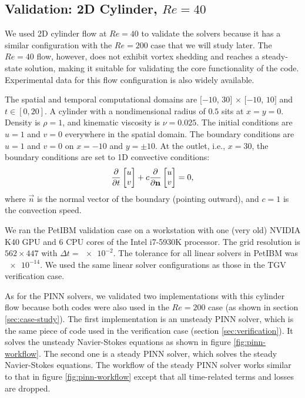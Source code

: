 
\subsection{Validation: 2D Cylinder, $Re=\num{40}$}\label{sec:val_2d_cylinder_re40}

We used 2D cylinder flow at $Re=40$ to validate the solvers because it has a similar configuration with the $Re=200$ case that we will study later.
The $Re=40$ flow, however, does not exhibit vortex shedding and reaches a steady-state solution, making it suitable for validating the core functionality of the code.
Experimental data for this flow configuration is also widely available.

The spatial and temporal computational domains are $[-10$, $30]$ $\times$ $[-10$, $10]$ and $t \in [0, 20]$.
A cylinder with a nondimensional radius of $0.5$ sits at $x=y=0$.
Density is $\rho=1$, and kinematic viscosity is $\nu=0.025$.
The initial conditions are $u=1$ and $v=0$ everywhere in the spatial domain.
The boundary conditions are $u=1$ and $v=0$ on $x=-10$ and $y=\pm 10$.
At the outlet, i.e., $x=30$, the boundary conditions are set to 1D convective conditions:
\begin{equation}\label{eq:convec-bc}
    \frac{\partial }{\partial t}\begin{bmatrix} u \\ v \end{bmatrix}
    +
    c\frac{\partial }{\partial \mathbf{n}}\begin{bmatrix} u \\ v \end{bmatrix} = 0,
\end{equation}
where $\vec{n}$ is the normal vector of the boundary (pointing outward), and $c=1$ is the convection speed.

We ran the PetIBM validation case on a workstation with one (very old) NVIDIA K40 GPU and 6 CPU cores of the Intel i7-5930K processor.
The grid resolution is $562 \times 447$ with $\Delta t=\num{e-2}$.
The tolerance for all linear solvers in PetIBM was $\num{e-14}$.
We used the same linear solver configurations as those in the TGV verification case.

As for the PINN solvers, we validated two implementations with this cylinder flow because both codes were also used in the $Re=200$ case (as shown in section \ref{sec:case-study}).
The first implementation is an unsteady PINN solver, which is the same piece of code used in the verification case (section \ref{sec:verification}).
It solves the unsteady Navier-Stokes equations as shown in figure \ref{fig:pinn-workflow}.
The second one is a steady PINN solver, which solves the steady Navier-Stokes equations.
The workflow of the steady PINN solver works similar to that in figure \ref{fig:pinn-workflow} except that all time-related terms and losses are dropped.

